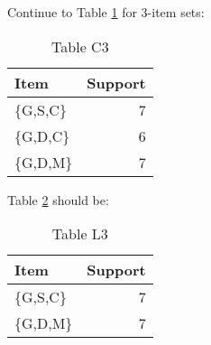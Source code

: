 \documentclass[10pt]{article}
\begin{document}
Continue to Table \ref{tbl:C3} for 3-item sets:
\begin{table}[htb]
\caption{\label{tbl:C3}Table C3}
\begin{center}
\begin{tabular}{lr}
 Item       &  Support  \\
\hline
 \{G,S,C\}  &        7  \\
 \{G,D,C\}  &        6  \\
 \{G,D,M\}  &        7  \\
\end{tabular}
\end{center}
\end{table}

Table \ref{tbl:L3} should be:
\begin{table}[htb]
\caption{\label{tbl:L3}Table L3}
\begin{center}
\begin{tabular}{lr}
 Item       &  Support  \\
\hline
 \{G,S,C\}  &        7  \\
 \{G,D,M\}  &        7  \\
\end{tabular}
\end{center}
\end{table}
\end{document}
